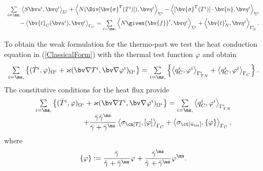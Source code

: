 \begin{equation} \label{ThElContWeakMech}
\begin{array}{r}
\sum \limits_{i=\ms,\sl}  
\left\langle S \bv u^i, \bv \eta^i \right\rangle_{\Sigma^i} 
+ \left\langle  N (\Div[\bv{\sigma}^T(T^i)]), \bv \eta^i \right\rangle_{\Sigma^i}
- \left\langle [\bv{\sigma}^T(T^i)] \cdot \bv{n}, \bv \eta^i\right\rangle_{\Sigma^i} \\[2ex]
- \left\langle \bv{t}_C(\bv u^i), \bv \eta^i \right\rangle_{\Gamma_C} 
= \sum \limits_{i=\ms,\sl} 
\left\langle N \given{\bv{f}}^i, \bv \eta^i \right\rangle_{\Sigma^i}
+ \left\langle \bv{t}^i_N, \bv \eta^i \right\rangle_{\Gamma_N^i}.
\end{array}
\end{equation}


To obtain the weak formulation for the thermo-part we test the heat conduction equation in (\ref{ClassicalForm}) with the thermal test function $\varphi$ \cite{JoKl93} and obtain
\begin{equation*} 
\begin{array}{r}
\sum \limits_{i=\ms,\sl} \left\lbrace 
(\dot T^i,\varphi)_{\Omega^i} 
+ \varkappa (\bv \nabla T^i, \bv \nabla \varphi^i)_{\Omega^i} \right\rbrace 
= \sum \limits_{i=\ms,\sl} \left\lbrace 
\left\langle q_{C}^i,\varphi^i \right\rangle_{\Gamma^i_{TN}} 
+ \left\langle q_{C}^i,\varphi^i \right\rangle_{\Gamma_C} \right\rbrace.
\end{array}
\end{equation*}
The constitutive conditions for the heat flux provide
\begin{equation} \label{WeakThermo}
\begin{array}{r}
\sum \limits_{i=\ms,\sl} \left\lbrace 
(\dot T^i,\varphi)_{\Omega^i} 
+ \varkappa (\bv \nabla T^i, \bv \nabla \varphi^i)_{\Omega^i} \right\rbrace 
= \sum \limits_{i=\ms,\sl} 
\left\langle q_{C}^i,\varphi^i \right\rangle_{\Gamma^i_{TN}} \\
+ \dfrac{\bar{\gamma}^{\sl} \bar{\gamma}^{\ms}}{\bar{\gamma}^{\sl} + \bar{\gamma}^{\ms}} \left\langle \sigma_\cn [T], [\varphi] \right\rangle_{\Gamma_C}
+ \left\langle \sigma_\ct [\dot u_\ct], \{\varphi\} \right\rangle_{\Gamma_C},
\end{array}
\end{equation}
where
\[
\{\varphi\}:= \dfrac{\bar{\gamma}^{\sl}}{\bar{\gamma}^{\sl} + \bar{\gamma}^{\ms}} \varphi^{\sl} + \dfrac{\bar{\gamma}^{\ms}}{\bar{\gamma}^{\sl} + \bar{\gamma}^{\ms}} \varphi^{\ms}.
\]

